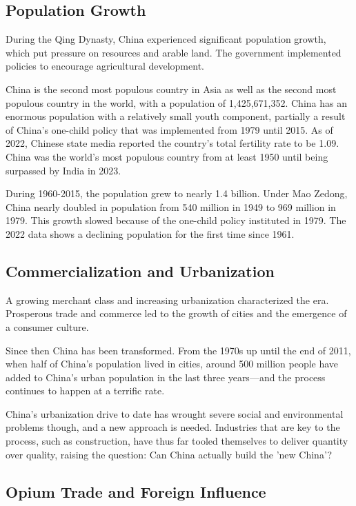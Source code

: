 \subsection{Population Growth}

During the Qing Dynasty, China experienced significant population growth, 
which put pressure on resources and arable land. The government implemented 
policies to encourage agricultural development.

China is the second most populous country in Asia as well as the second most 
populous country in the world, with a population of 1,425,671,352.
China has an enormous population with a relatively small youth component, 
partially a result of China's one-child policy that was implemented from 
1979 until 2015. As of 2022, Chinese state media reported the country's 
total fertility rate to be 1.09. China was the world's most populous country 
from at least 1950 until being surpassed by India in 2023.

During 1960-2015, the population grew to nearly 1.4 billion. Under Mao Zedong, 
China nearly doubled in population from 540 million in 1949 to 969 million in 
1979. This growth slowed because of the one-child policy instituted in 1979. 
The 2022 data shows a declining population for the first time since 1961.

\subsection{Commercialization and Urbanization}

A growing merchant class and increasing urbanization characterized the era. 
Prosperous trade and commerce led to the growth of cities and the emergence 
of a consumer culture.

Since then China has been transformed. From the 1970s up until the end of 
2011, when half of China's population lived in cities, around 500 million 
people have added to China's urban population in the last three years—and 
the process continues to happen at a terrific rate.

China's urbanization drive to date has wrought severe social and environmental 
problems though, and a new approach is needed. Industries that are key to the 
process, such as construction, have thus far tooled themselves to deliver 
quantity over quality, raising the question: Can China actually build the 
'new China'?

\subsection{Opium Trade and Foreign Influence}


